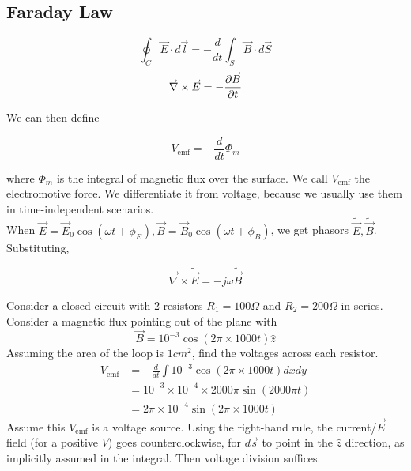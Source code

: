 \documentclass[12pt]{article}
\begin{document}
\subsection{Faraday Law}

$$\oint_C \vec E \cdot d\vec l = -\frac{d}{dt} \int_S \vec B \cdot d\vec S$$
$$\vec\nabla \times \vec E = -\frac{\partial \vec B}{\partial t}$$

We can then define

$$V_{\text{emf}} = -\frac{d}{dt} \Phi_m$$

where $\Phi_m$ is the integral of magnetic flux over the surface. We call $V_{\text{emf}}$ the electromotive force. We differentiate it from voltage, because we usually use them in time-independent scenarios. \\
When $\vec E = \vec E_0\cos(\omega t + \phi_E), \vec B = \vec B_0\cos(\omega t + \phi_B)$, we get phasors $\tilde{\vec E}, \tilde{\vec B}$. Substituting,

$$\vec\nabla \times \tilde{\vec E} = -j\omega \tilde{\vec B}$$

\begin{ex}
    Consider a closed circuit with 2 resistors $R_1 = 100\unit{\Omega}$ and $R_2 = 200\unit{\Omega}$ in series. Consider a magnetic flux pointing out of the plane with
    $$\vec B = 10^{-3}\cos(2\pi \times 1000t)\hat z$$
    Assuming the area of the loop is $1\unit{cm^2}$, find the voltages across each resistor.
    \begin{align*}
        V_{\text{emf}} &= -\frac{d}{dt} \int 10^{-3} \cos(2\pi \times 1000t) dxdy \\
                       &= 10^{-3} \times 10^{-4} \times 2000\pi\sin(2000\pi t) \\
                       &= 2\pi \times 10^{-4}\sin(2\pi \times 1000t)
    \end{align*}
    Assume this $V_{\text{emf}}$ is a voltage source. Using the right-hand rule, the current/$\vec E$ field (for a positive $V$) goes counterclockwise, for $d\vec s$ to point in the $\hat z$ direction, as implicitly assumed in the integral. Then voltage division suffices.
\end{ex}
\end{document}
